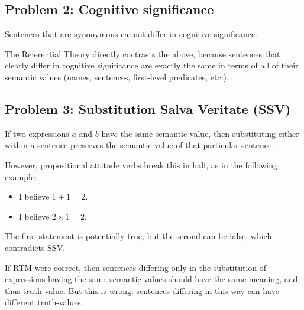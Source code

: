 \subsection*{Problem 2: Cognitive significance}

\begin{definition}
Sentences that are synonymous cannot differ in cognitive significance.
\end{definition}

The Referential Theory directly contrasts the above, because sentences that clearly differ in cognitive significance are exactly the same in terms of all of their semantic values (names, sentences, first-level predicates, etc.).

\subsection*{Problem 3: Substitution Salva Veritate (SSV)}

\begin{definition}
If two expressions $a$ and $b$ have the same semantic value, then substituting either within a sentence preserves the semantic value of that particular sentence.
\end{definition}

However, propositional attitude verbs break this in half, as in the following example:

\begin{example}\leavevmode
\begin{itemize}
  \item I believe $1 + 1 = 2$.
  \item I believe $2 \times 1 = 2$.
\end{itemize}
The first statement is potentially true, but the second can be false, which contradicts SSV.
\end{example}

If RTM were correct, then sentences differing only in the substitution of expressions having the same semantic values should have the same meaning, and thus truth-value. But this is wrong: sentences differing in this way can have different truth-values.
